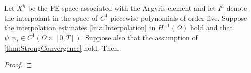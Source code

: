 \begin{lemma} \label{lma:Interpolation}

\end{lemma}

\begin{thm} \label{thm:SemiInterp}
  Let $X^h$ be the FE space associated with the Argyris element and let $I^h$
  denote the interpolant in the space of $C^1$ piecewise polynomials of order
  five. Suppose the interpolation estimates \autoref{lma:Interpolation}
  in $H^{-1}(\Omega)$ hold and that $\psi, \psi_t \in C^1(\Omega\times [0,T])$.
  Suppose also that the assumption of \autoref{thm:StrongConvergence} hold.
  Then,
\end{thm}
\begin{proof}

\end{proof}
